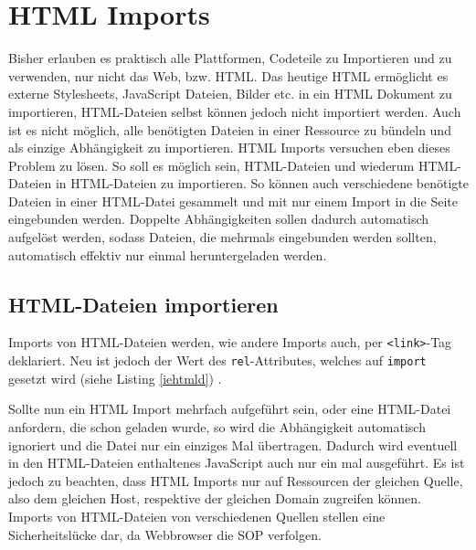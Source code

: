 \section{HTML Imports}\label{html-imports}

Bisher erlauben es praktisch alle Plattformen, Codeteile zu Importieren und zu verwenden, nur nicht das Web, bzw. \ac{HTML}. Das heutige \ac{HTML} ermöglicht es externe Stylesheets, JavaScript Dateien, Bilder etc. in ein \ac{HTML} Dokument zu importieren, \ac{HTML}-Dateien selbst können jedoch nicht importiert werden. Auch ist es nicht möglich, alle benötigten Dateien in einer Ressource zu bündeln und als einzige Abhängigkeit zu importieren. \ac{HTML} Imports versuchen eben dieses Problem zu lösen. So soll es möglich sein, \ac{HTML}-Dateien und wiederum \ac{HTML}-Dateien in \ac{HTML}-Dateien zu importieren. So können auch verschiedene benötigte Dateien in einer \ac{HTML}-Datei gesammelt und mit nur einem Import in die Seite eingebunden werden. Doppelte Abhängigkeiten sollen dadurch automatisch aufgelöst werden, sodass Dateien, die mehrmals eingebunden werden sollten, automatisch effektiv nur einmal heruntergeladen werden.


\subsection{HTML-Dateien importieren}\label{html-dateien-importieren}

Imports von \ac{HTML}-Dateien werden, wie andere Imports auch, per \texttt{\textless{}link\textgreater{}}-Tag deklariert. Neu ist jedoch der Wert des \texttt{rel}-Attributes, welches auf \texttt{import} gesetzt wird (siehe Listing \ref{iehtmld}) \cite[S. 139-147]{citeulike:13844975}.



Sollte nun ein \ac{HTML} Import mehrfach aufgeführt sein, oder eine \ac{HTML}-Datei anfordern, die schon geladen wurde, so wird die Abhängigkeit automatisch ignoriert und die Datei nur ein einziges Mal übertragen. Dadurch wird eventuell in den \ac{HTML}-Dateien enthaltenes JavaScript auch nur ein mal ausgeführt. Es ist jedoch zu beachten, dass \ac{HTML} Imports nur auf Ressourcen der gleichen Quelle, also dem gleichen Host, respektive der gleichen Domain zugreifen können. Imports von \ac{HTML}-Dateien von verschiedenen Quellen stellen eine Sicherheitslücke dar, da Webbrowser die \ac{SOP} verfolgen.

